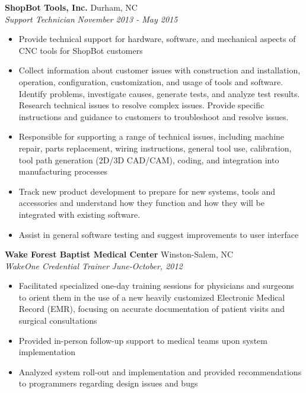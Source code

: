 \documentclass[11pt]{article}
\begin{document}
\noindent
{\bf ShopBot Tools, Inc.} \hfill Durham, NC\\
{\it Support Technician} \hfill {\it November 2013 - May 2015}

\begin{itemize}
\setlength{\itemsep}{1pt}

\item Provide technical support for hardware, software, and mechanical
aspects of CNC tools for ShopBot customers

\item Collect information about customer issues with construction and
installation, operation, configuration, customization, and usage of tools
and software. Identify problems, investigate causes, generate tests,
and analyze test results. Research technical issues to resolve complex
issues. Provide specific instructions and guidance to customers to
troubleshoot and resolve issues.

\item Responsible for supporting a range of technical issues, including
machine repair, parts replacement, wiring instructions, general tool use,
calibration, tool path generation (2D/3D CAD/CAM), coding, and integration
into manufacturing processes

\item Track new product development to prepare for new systems, tools and
accessories and understand how they function and how they will be integrated
  with existing software.
\item Assist in general software testing and suggest improvements to user
interface

\end{itemize}
\vspace{10pt}

\noindent
{\bf Wake Forest Baptist Medical Center} \hfill Winston-Salem, NC\\
{\it WakeOne Credential Trainer} \hfill {\it June-October, 2012}

\begin{itemize}
\setlength{\itemsep}{1pt}

\item Facilitated specialized one-day training sessions for physicians
and surgeons to orient them in the use of a new heavily customized Electronic
Medical Record (EMR), focusing on accurate documentation of patient visits
and surgical consultations

\item Provided in-person follow-up support to medical teams upon system
implementation

\item Analyzed system roll-out and implementation and provided
recommendations to programmers regarding design issues and bugs

\end{itemize}
\vspace{1pt}
\end{document}
